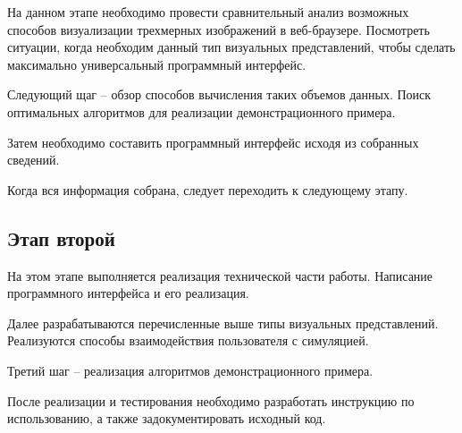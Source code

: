 На данном этапе необходимо провести сравнительный анализ возможных способов визуализации
трехмерных изображений в веб-браузере. Посмотреть ситуации, когда необходим данный тип 
визуальных представлений, чтобы сделать максимально универсальный программный интерфейс.

Следующий щаг -- обзор способов вычисления таких объемов данных. Поиск оптимальных
алгоритмов для реализации демонстрационного примера.

Затем необходимо составить программный интерфейс исходя из собранных сведений.

Когда вся информация собрана, следует переходить к следующему этапу.

\subsection{Этап второй}

На этом этапе выполняется реализация технической части работы. Написание программного
интерфейса и его реализация. 

Далее разрабатываются перечисленные выше типы визуальных представлений. Реализуются
способы взаимодействия пользователя с симуляцией.

Третий шаг -- реализация алгоритмов демонстрационного примера.

После реализации и тестирования необходимо разработать инструкцию по использованию, а
также задокументировать исходный код.

